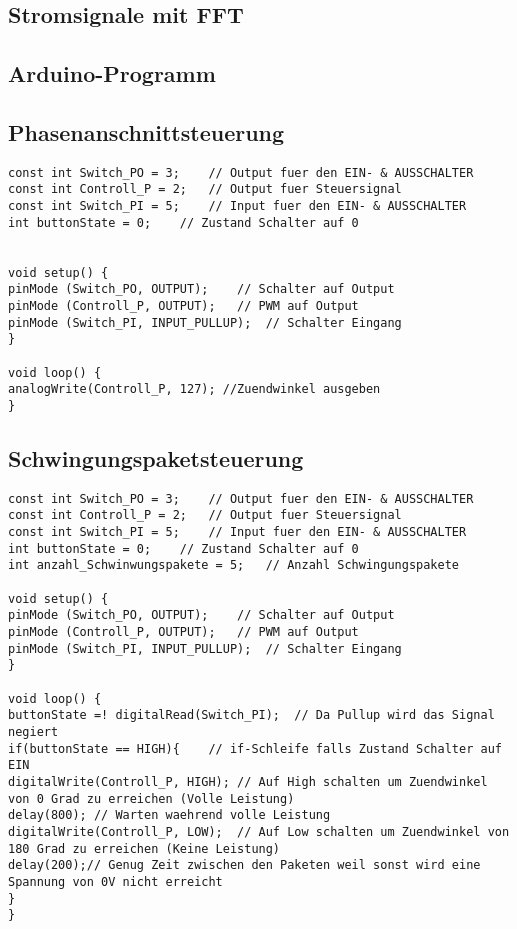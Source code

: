 \begin{appendix}
\subsection*{Stromsignale mit FFT}\label{sec:Stroeme_Messungen}



\newpage
\subsection{Arduino-Programm}

\subsection*{Phasenanschnittsteuerung}
\begin{lstlisting}[basicstyle=\tiny,style=myArduino]
const int Switch_PO = 3;	// Output fuer den EIN- & AUSSCHALTER
const int Controll_P = 2;	// Output fuer Steuersignal
const int Switch_PI = 5;	// Input fuer den EIN- & AUSSCHALTER
int buttonState = 0;	// Zustand Schalter auf 0


void setup() {
pinMode (Switch_PO, OUTPUT);	// Schalter auf Output
pinMode (Controll_P, OUTPUT);	// PWM auf Output
pinMode (Switch_PI, INPUT_PULLUP);	// Schalter Eingang
}

void loop() {
analogWrite(Controll_P, 127); //Zuendwinkel ausgeben
}
\end{lstlisting}


\subsection*{Schwingungspaketsteuerung}
\begin{lstlisting}[basicstyle=\tiny,style=myArduino]
const int Switch_PO = 3;	// Output fuer den EIN- & AUSSCHALTER
const int Controll_P = 2;	// Output fuer Steuersignal
const int Switch_PI = 5;	// Input fuer den EIN- & AUSSCHALTER
int buttonState = 0;	// Zustand Schalter auf 0
int anzahl_Schwinwungspakete = 5;	// Anzahl Schwingungspakete

void setup() {
pinMode (Switch_PO, OUTPUT);	// Schalter auf Output
pinMode (Controll_P, OUTPUT);	// PWM auf Output
pinMode (Switch_PI, INPUT_PULLUP);	// Schalter Eingang
}

void loop() {
buttonState =! digitalRead(Switch_PI);	// Da Pullup wird das Signal negiert
if(buttonState == HIGH){	// if-Schleife falls Zustand Schalter auf EIN
digitalWrite(Controll_P, HIGH);	// Auf High schalten um Zuendwinkel von 0 Grad zu erreichen (Volle Leistung)
delay(800);	// Warten waehrend volle Leistung
digitalWrite(Controll_P, LOW);	// Auf Low schalten um Zuendwinkel von 180 Grad zu erreichen (Keine Leistung)
delay(200);// Genug Zeit zwischen den Paketen weil sonst wird eine Spannung von 0V nicht erreicht     
}
}
\end{lstlisting}


\end{appendix}
